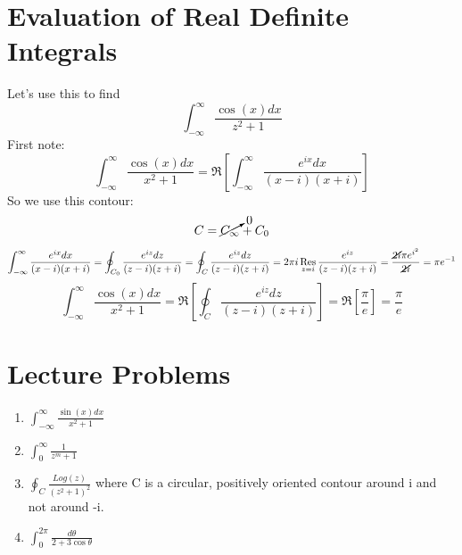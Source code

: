 \documentclass[11pt,notitlepage]{article}
\DeclareMathOperator*{\res}{Res}
\begin{document}
\section{Evaluation of Real Definite Integrals}
Let's use this to find $$\int_{-\infty}^{\infty} \frac{\cos(x)dx}{z^2+1}$$
First note: $$\int_{-\infty}^{\infty} \frac{\cos(x)dx}{x^2+1} = \Re\left[\int_{-\infty}^{\infty} \frac{e^{ix}dx}{(x-i)(x+i)}\right]$$
So we use this contour: $$C = \cancelto0{C_\infty} + C_0$$
$$ \int_{-\infty}^{\infty} \frac{e^{ix}dx}{(x-i)(x+i)} = \oint_{C_0} \frac{e^{iz}dz}{(z-i)(z+i)} = \oint_C \frac{e^{iz}dz}{(z-i)(z+i)} = 2\pi i\res_{z=i}\frac{e^{iz}}{(z-i)(z+i)} = \frac{\cancel{2i}\pi e^{i^2}}{\cancel{2i}}=\pi e^{-1}$$
$$ \int_{-\infty}^{\infty} \frac{\cos(x)dx}{x^2+1} =\Re\left[\oint_C \frac{e^{iz}dz}{(z-i)(z+i)}\right] =\Re\left[\frac\pi e\right] =\frac\pi e$$
\section{Lecture Problems}
\begin{enumerate}
\item $\int_{-\infty}^{\infty} \frac{\sin(x)dx}{x^2+1}$
\item $\int_{0}^{\infty} \frac1{z^m+1}$
\item $\oint_C \frac{Log(z)}{(z^2+1)^2}$ where C is a circular, positively oriented contour around i and not around -i.
\item $\int_0^{2\pi}\frac{d\theta}{2+3\cos{\theta}}$
\end{enumerate}
\end{document}
